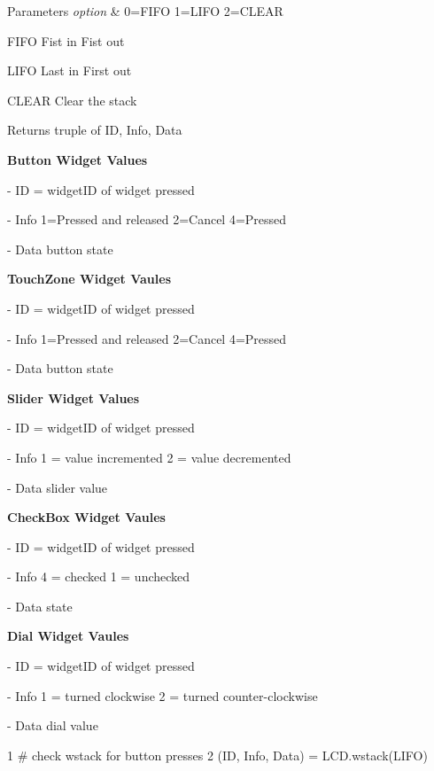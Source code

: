 \begin{DoxyParams}{Parameters}
{\em option} & 0=F\-I\-F\-O 1=L\-I\-F\-O 2=C\-L\-E\-A\-R \par
 F\-I\-F\-O Fist in Fist out \par
 L\-I\-F\-O Last in First out \par
 C\-L\-E\-A\-R Clear the stack \\
\hline
\end{DoxyParams}
\begin{DoxyReturn}{Returns}
truple of I\-D, Info, Data \par
\par
{\bfseries  Button Widget Values } \par
 -\/ I\-D = widget\-I\-D of widget pressed \par
 -\/ Info 1=Pressed and released 2=Cancel 4=Pressed \par
 -\/ Data button state \par
\par
{\bfseries  Touch\-Zone Widget Vaules } \par
 -\/ I\-D = widget\-I\-D of widget pressed \par
 -\/ Info 1=Pressed and released 2=Cancel 4=Pressed \par
 -\/ Data button state \par
\par
{\bfseries  Slider Widget Values } \par
 -\/ I\-D = widget\-I\-D of widget pressed \par
 -\/ Info 1 = value incremented 2 = value decremented \par
 -\/ Data slider value \par
\par
{\bfseries  Check\-Box Widget Vaules } \par
 -\/ I\-D = widget\-I\-D of widget pressed \par
 -\/ Info 4 = checked 1 = unchecked \par
 -\/ Data state \par
\par
{\bfseries  Dial Widget Vaules } \par
 -\/ I\-D = widget\-I\-D of widget pressed \par
 -\/ Info 1 = turned clockwise 2 = turned counter-\/clockwise \par
 -\/ Data dial value 
\begin{DoxyCode}
1 \textcolor{comment}{# check wstack for button presses}
2 (ID, Info, Data) = LCD.wstack(LIFO)
\end{DoxyCode}
 
\end{DoxyReturn}
